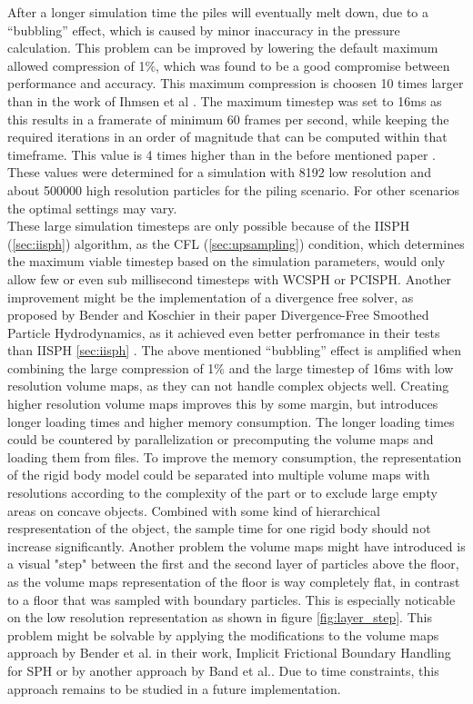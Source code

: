 \documentclass[intern]{cgMA}
\begin{document}
    After a longer simulation time the piles will eventually melt down, due to a \enquote{bubbling} effect, which is caused by minor inaccuracy in the pressure calculation. This problem can be improved by lowering the default maximum allowed compression of 1\%, which was found to be a good compromise between performance and accuracy. This maximum compression is choosen 10 times larger than in the work of Ihmsen et al \cite{6570475}. The maximum timestep was set to 16ms as this results in a framerate of minimum 60 frames per second, while keeping the required iterations in an order of magnitude that can be computed within that timeframe. This value is 4 times higher than in the before mentioned paper \cite{6570475}. These values were determined for a simulation with 8192 low resolution and about 500000 high resolution particles for the piling scenario. For other scenarios the optimal settings may vary.\\
    These large simulation timesteps are only possible because of the IISPH (\ref{sec:iisph}) algorithm, as the CFL (\ref{sec:upsampling}) condition, which determines the maximum viable timestep based on the simulation parameters, would only allow few or even sub millisecond timesteps with WCSPH or PCISPH. Another improvement might be the implementation of a divergence free solver, as proposed by Bender and Koschier in their paper Divergence-Free Smoothed Particle Hydrodynamics, as it achieved even better perfromance in their tests than IISPH \ref{sec:iisph} \cite{10.1145/2786784.2786796}.
    The above mentioned \enquote{bubbling} effect is amplified when combining the large compression of 1\% and the large timestep of 16ms with low resolution volume maps, as they can not handle complex objects well. Creating higher resolution volume maps improves this by some margin, but introduces longer loading times and higher memory consumption. 
    The longer loading times could be countered by parallelization or precomputing the volume maps and loading them from files.
    To improve the memory consumption, the representation of the rigid body model could be separated into multiple volume maps with resolutions according to the complexity of the part or to exclude large empty areas on concave objects. Combined with some kind of hierarchical respresentation of the object, the sample time for one rigid body should not increase significantly.
    Another problem the volume maps might have introduced is a visual "step" between the first and the second layer of particles above the floor, as the volume maps representation of the floor is way completely flat, in contrast to a floor that was sampled with boundary particles. This is especially noticable on the low resolution representation as shown in figure \ref{fig:layer_step}. This problem might be solvable by applying the modifications to the volume maps approach by Bender et al. in their work, Implicit Frictional Boundary Handling for SPH \cite{9123549} or by another approach by Band et al.\cite{10.1145/3180486}. Due to time constraints, this approach remains to be studied in a future implementation.
\end{document}
